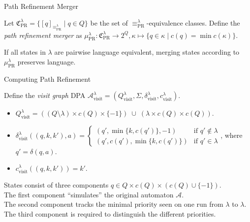 \begin{frame}{Path Refinement Merger}
\begin{defn}
	Let $\mathfrak{C}_\text{PR}^\lambda = \{ [q]_{\equiv_\text{PR}^\lambda} \mid q \in Q \}$ be the set of $\equiv_\text{PR}^\lambda$-equivalence classes. Define the \emph{path refinement merger} as $\mu_\text{PR}^\lambda : \mathfrak{C}_\text{PR}^\lambda \rightarrow 2^Q, \kappa \mapsto \{ q \in \kappa \mid c(q) = \min c(\kappa) \}$.
\end{defn}

\begin{theorem}
	If all states in $\lambda$ are pairwise language equivalent, merging states according to $\mu_\text{PR}^\lambda$ preserves language.
\end{theorem}
\end{frame}


\begin{frame}{Computing Path Refinement}
	\begin{defn}
		Define the \emph{visit graph} DPA $\mathcal{A}_\text{visit}^\lambda = (Q_\text{visit}^\lambda, \Sigma, \delta_\text{visit}^\lambda, c_\text{visit}^\lambda)$.
		\begin{itemize}
			\item $Q_\text{visit}^\lambda = ((Q \setminus \lambda) \times c(Q) \times \{-1\}) \;\cup\; (\lambda \times c(Q) \times c(Q))$.
			\item $\delta^\lambda_\text{visit}((q, k, k'), a) = \begin{cases}
				(q', \min \{k, c(q')\}, -1) & \text{if } q' \notin \lambda \\
				(q', c(q'), \min \{k, c(q')\}) & \text{if } q' \in \lambda
			\end{cases}$, where $q' = \delta(q, a)$.
			\item $c_\text{visit}^\lambda((q, k, k')) = k'$.
		\end{itemize}
	\end{defn}
	
	States consist of three components $q \in Q \times c(Q) \times (c(Q) \cup \{-1\})$. \\
	The first component \enquote{simulates} the original automaton $\mathcal{A}$. \\
	The second component tracks the minimal priority seen on one run from $\lambda$ to $\lambda$. \\
	The third component is required to distinguish the different priorities.
\end{frame}


